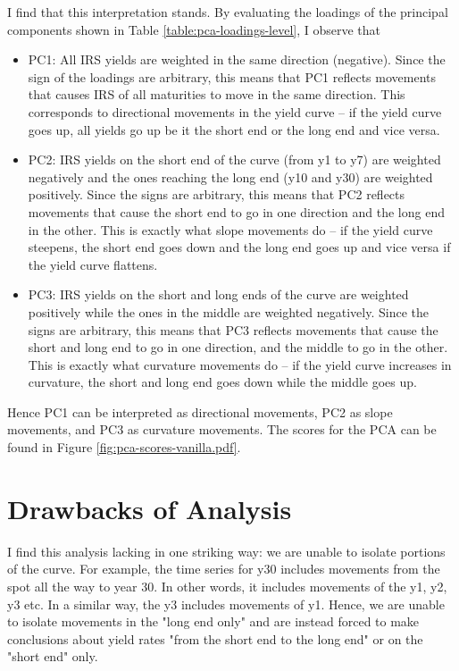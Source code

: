 \documentclass[11pt]{scrreprt}
\begin{document}
I find that this interpretation stands. By evaluating the loadings of the principal components shown in Table \ref{table:pca-loadings-level}, I observe that

\begin{itemize}
\item PC1: All IRS yields are weighted in the same direction (negative). Since the sign of the loadings are arbitrary, this means that PC1 reflects movements that causes IRS of all maturities to move in the same direction. This corresponds to directional movements in the yield curve -- if the yield curve goes up, all yields go up be it the short end or the long end and vice versa.
\item PC2: IRS yields on the short end of the curve (from y1 to y7) are weighted negatively and the ones reaching the long end (y10 and y30) are weighted positively. Since the signs are arbitrary, this means that PC2 reflects movements that cause the short end to go in one direction and the long end in the other. This is exactly what slope movements do -- if the yield curve steepens, the short end goes down and the long end goes up and vice versa if the yield curve flattens.
\item PC3: IRS yields on the short and long ends of the curve are weighted positively while the ones in the middle are weighted negatively. Since the signs are arbitrary, this means that PC3 reflects movements that cause the short and long end to go in one direction, and the middle to go in the other. This is exactly what curvature movements do -- if the yield curve increases in curvature, the short and long end goes down while the middle goes up.
\end{itemize}

Hence PC1 can be interpreted as directional movements, PC2 as slope movements, and PC3 as curvature movements. The scores for the PCA can be found in Figure \ref{fig:pca-scores-vanilla.pdf}.

\section{Drawbacks of Analysis}

I find this analysis lacking in one striking way: we are unable to isolate portions of the curve. For example, the time series for y30 includes movements from the spot all the way to year 30. In other words, it includes movements of the y1, y2, y3 etc. In a similar way, the y3 includes movements of y1. Hence, we are unable to isolate movements in the "long end only" and are instead forced to make conclusions about yield rates "from the short end to the long end" or on the "short end" only.
\end{document}
